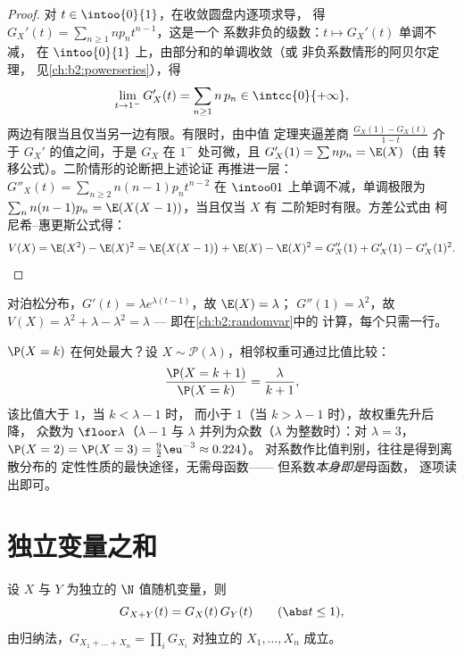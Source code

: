 \begin{proof}
对 $t \in \intoo{0}{1}$，在收敛圆盘内逐项求导，
得 $G_X'(t) = \sum_{n\geq1} np_n t^{n-1}$，这是一个
系数非负的级数：$t \mapsto G_X'(t)$ 单调不减，
在 $\intoo{0}{1}$ 上，由部分和的单调收敛（或
非负系数情形的阿贝尔定理，
见\cref{ch:b2:powerseries}），得
\[
\lim_{t \to 1^-} G_X'(t)
= \sum_{n\geq1} n\,p_n \in \intcc{0}{+\infty} ,
\]
两边有限当且仅当另一边有限。有限时，由中值
定理夹逼差商 $\frac{G_X(1) -
G_X(t)}{1 - t}$ 介于 $G_X'$ 的值之间，于是 $G_X$
在 $1^-$ 处可微，且 $G_X'(1) = \sum np_n = \E(X)$（由
转移公式）。二阶情形的论断把上述论证
再推进一层：$G''_X(t) = \sum_{n\geq2}n(n-1)p_nt^{n-2}$ 在
$\intoo01$ 上单调不减，单调极限为
$\sum_nn(n-1)p_n = \E(X(X-1))$，当且仅当 $X$ 有
二阶矩时有限。方差公式由
柯尼希–惠更斯公式得：
\[
V(X) = \E(X^2) - \E(X)^2 = \E\bigl(X(X-1)\bigr) + \E(X) -
\E(X)^2 = G''_X(1) + G'_X(1) - G'_X(1)^2 .
\]
\end{proof}

\begin{example}
对泊松分布，$G'(t) = \lambda e^{\lambda(t-1)}$，故 $\E(X) = \lambda$；
$G''(1) = \lambda^2$，故 $V(X) = \lambda^2 + \lambda - \lambda^2 =
\lambda$ --- 即在\cref{ch:b2:randomvar}中的
计算，每个只需一行。
\end{example}

\begin{example}[泊松分布的众数]
\label{ex:b2:genfun:poissonmode}
$\P(X = k)$ 在何处最大？设 $X \sim \mathcal
P(\lambda)$，相邻权重可通过比值比较：
\[
\frac{\P(X = k+1)}{\P(X = k)} = \frac{\lambda}{k + 1} ,
\]
该比值大于 $1$，当 $k < \lambda - 1$ 时，
而小于 $1$（当 $k > \lambda - 1$ 时），故权重先升后降，
众数为 $\floor\lambda$（$\lambda - 1$ 与
$\lambda$ 并列为众数（$\lambda$ 为整数时）：对 $\lambda = 3$，
$\P(X = 2) = \P(X = 3) = \frac92\eu^{-3} \approx 0.224$）。
对系数作比值判别，往往是得到离散分布的
定性性质的最快途径，无需母函数——
但系数\emph{本身即是}母函数，
逐项读出即可。
\end{example}

\section{独立变量之和}

\begin{theorem}[乘性]\label{thm:b2:genfun:product}
设 $X$ 与 $Y$ 为独立的 $\N$ 值随机变量，则
\[
G_{X + Y}(t) = G_X(t)\,G_Y(t)
\qquad (\abs t \leq 1),
\]
由归纳法，$G_{X_1 + \dots + X_n} = \prod_i G_{X_i}$
对独立的 $X_1, \dots, X_n$ 成立。
\end{theorem}

